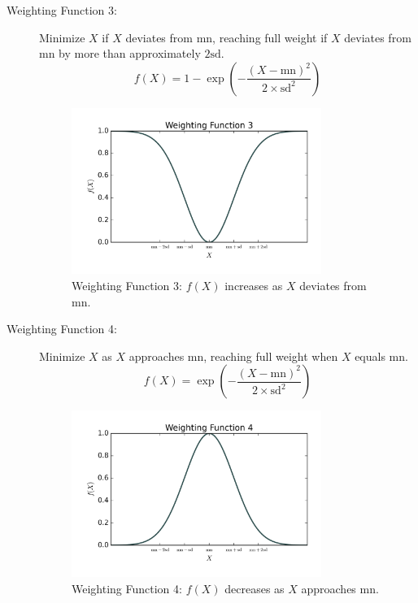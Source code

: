 \documentclass[a4paper,12pt]{article}
\begin{document}
\begin{description}
    \item[Weighting Function 3:] Minimize \(X\) if \(X\) deviates from \(\text{mn}\), reaching full weight if \(X\) deviates from \(\text{mn}\) by more than approximately \(2\text{sd}\).
    \begin{equation}
    f(X) = 1 - \exp\left(-\frac{(X - \text{mn})^2}{2 \times \text{sd}^2}\right)
    \end{equation}
    \begin{figure}[H]
        \centering
        \includegraphics[width=0.8\textwidth]{figures/weighting_function_3.png}
        \caption{Weighting Function 3: \(f(X)\) increases as \(X\) deviates from \(\text{mn}\).}
    \end{figure}

    \item[Weighting Function 4:] Minimize \(X\) as \(X\) approaches \(\text{mn}\), reaching full weight when \(X\) equals \(\text{mn}\).
    \begin{equation}
    f(X) = \exp\left(-\frac{(X - \text{mn})^2}{2 \times \text{sd}^2}\right)
    \end{equation}
    \begin{figure}[H]
        \centering
        \includegraphics[width=0.8\textwidth]{figures/weighting_function_4.png}
        \caption{Weighting Function 4: \(f(X)\) decreases as \(X\) approaches \(\text{mn}\).}
    \end{figure}
\end{description}
\end{document}
